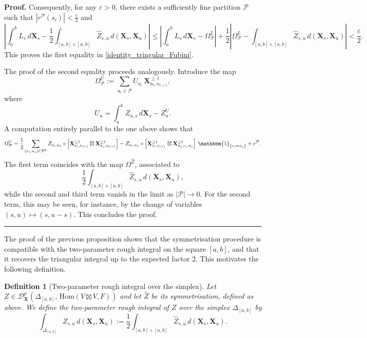 \documentclass{article}%
\newtheorem{definition}[theorem]{Definition}
\newenvironment{proof}[1][Proof]{\noindent\textbf{#1.} }{\ \rule{0.5em}{0.5em}}
\begin{document}
\begin{proof}
Consequently, for any $\varepsilon>0$, there exists a sufficiently fine partition
$\mathcal{P}$ such that $|r^\mathcal{P}(s_i)|< \frac{\epsilon}{2}$ and
\[
\left|
\int_a^b L_s \, d\mathbf{X}_s
- \frac12 \int_{[a,b]\times[a,b]} \hat{Z}_{s,u} \,
d\left(\mathbf{X}_s, \mathbf{X}_u \right)
\right|
\leq
\left|
\int_a^b L_s \, d\mathbf{X}_s - \Omega^L_{\mathcal{P}}
\right|
+ \frac12
\left|
\Omega^L_{\mathcal{P}}
- \int_{[a,b]\times[a,b]} \hat{Z}_{s,u} \,
d\left(\mathbf{X}_s, \mathbf{X}_u \right)
\right|
< \frac{\varepsilon}{2}.
\]
This proves the first equality in \eqref{identity_tringular_Fubini}.

The proof of the second equality proceeds analogously. Introduce the map
\[
\Omega^U_{\mathcal{P}}
:= \sum_{u_i \in \mathcal{P}} U_{u_i}\,
\mathbf{X}^{\geq 1}_{u_i,u_{i+1}},
\]
where
\[
U_u = \int_u^b Z_{u,s}\, d\mathbf{X}_s
- Z^U_{u}.
\]
A computation entirely parallel to the one above shows that
\begin{align*}
\Omega^U_{\mathcal{P}}
=
\frac{1}{2} \sum_{(s_i,u_j)\in \mathcal{P}^2}
Z_{s_i,u_j} \circ
\left[\mathbf{X}^{\geq 1}_{s_i,s_{i+1}} \boxtimes
\mathbf{X}^{\geq 1}_{u_j,u_{j+1}}\right]
- Z_{s_i,u_j} \circ
\left[\mathbf{X}^{\geq 1}_{s_i,s_{i+1}} \boxtimes
\mathbf{X}^{\geq 1}_{u_{j+1},u_j}\right]
\,\mathbbm{1}_{\{s_i=u_j\}} + r^\mathcal{P}.
\end{align*}
The first term coincides with the map $\Omega^{\hat{Z}}$, associated to
\[
\frac{1}{2}\int_{[a,b]\times[a,b]} \hat{Z}_{s,u}\,
d\left(\mathbf{X}_s, \mathbf{X}_u \right),
\]
while the second and third term vanish in the limit as $|\mathcal{P}|\to 0$. For the second term, this may be seen, for instance, by the change of variables
$(s,u)\mapsto (s,u-s)$.
This concludes the proof.
\end{proof}

The proof of the previous proposition shows that the symmetrisation procedure is compatible with the two-parameter rough integral on the square $[a,b]$, and that it recovers the triangular integral up to the expected factor $2$. This motivates the following definition.

\begin{definition}[Two-parameter rough integral over the simplex]
Let $Z \in \mathcal{D}^{p}_{\mathbf{X}}\!\left(\Delta_{[a,b]},\,\mathrm{Hom}(V \boxtimes V, F)\right)$ and let $\widehat{Z}$ be its symmetrisation, defined as above. We define the two-parameter rough integral of $Z$ over the simplex $\Delta_{[a,b]}$ by
\begin{equation}\label{defining_identity_2p_simplex}
\int_{\Delta_{[a,b]}} Z_{s,u}\, d\left(\mathbf{X}_s,\mathbf{X}_u\right)
:= \frac{1}{2}\int_{[a,b]\times[a,b]} \widehat{Z}_{s,u}\, d\left(\mathbf{X}_s,\mathbf{X}_u\right).
\end{equation}
\end{definition}
\end{document}
